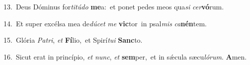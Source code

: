 {\numbfont\textcolor{\numbcolor}{13.}}~Deus Dóminus for\-\textit{ti}\-\textit{tú}\textit{do} \textbf{me}\-a:~\star et ponet pedes meos qua\textit{si} \textit{cer}\-\textbf{vó}rum.\par
{\numbfont\textcolor{\numbcolor}{14.}}~Et super excélsa mea de\-\textit{dú}\-\textit{cet} \textit{me} \textbf{vic}\-tor~\star in psal\textit{mis} \textit{ca}\-\textbf{nén}tem.\par
{\numbfont\textcolor{\numbcolor}{15.}}~Glória \textit{Pa}\-\textit{tri}, \textit{et} \textbf{Fí}\-lio,~\star et Spirí\-\textit{tu}\-\textit{i} \textbf{Sanc}\-to.\par
{\numbfont\textcolor{\numbcolor}{16.}}~Sicut erat in princípio, \textit{et} \textit{nunc}\-, \textit{et} \textbf{sem}\-per,~\star et in sǽcula sæcu\-\textit{ló}\-\textit{rum}. \textbf{A}\-men.\par
